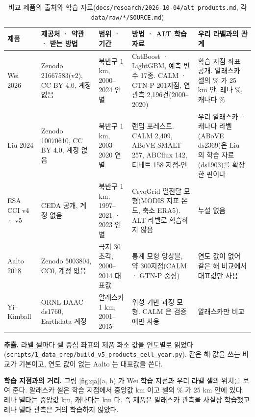 \documentclass[10pt]{article}
\begin{document}
\begin{table}[!htbp]\centering\footnotesize
\caption{비교 제품의 출처와 학습 자료(\texttt{docs/research/2026-10-04/alt\_products.md}, 각 \texttt{data/raw/*/SOURCE.md})}\label{tab:q2}
\begin{tabularx}{\textwidth}{>{\raggedright\arraybackslash}p{}>{\raggedright\arraybackslash}p{}>{\raggedright\arraybackslash}p{}YY}
\toprule
제품 & 제공처 · 약관 · 받는 방법 & 범위 · 기간 & 방법 · ALT 학습 자료 & 우리 라벨과의 관계 \\ \midrule
Wei 2026 & Zenodo 21667583(v2), CC BY 4.0, 계정 없음 & 북반구 1 km, 2000--2024 연별 & CatBoost · LightGBM, 예측 변수 17종. CALM · GTN-P 201지점, 연 관측 2,196건(2000--2020) & 학습 지점 좌표 공개. 알래스카 셀의 \ndistweiAkle{} \% 가 25 km 안, 레나 \ndistweiLele{} \%, 캐나다 \ndistweiCale{} \% \\
Liu 2024 & Zenodo 10070610, CC BY 4.0, 계정 없음 & 북반구 1 km, 2003--2020 연별 & 랜덤 포레스트. CALM 2,409, ABoVE SMALT 257, ABCflux 142, 티베트 158 지점-연 & 우리 알래스카 · 캐나다 라벨(ABoVE ds2369)은 Liu 의 학습 자료(ds1903)를 확장한 판이다 \\
ESA CCI v4 · v5 & CEDA 공개, 계정 없음 & 북반구 1 km, 1997--2021 · 2023 연별 & CryoGrid 열전달 모형(MODIS 지표 온도, 축소 ERA5). ALT 라벨로 학습하지 않음 & 누설 없음 \\
Aalto 2018 & Zenodo 5003804, CC0, 계정 없음 & 극지 30초각, 2000--2014 대표값 & 통계 모형 앙상블, 약 300지점(CALM · GTN-P 중심) & 연도 값이 없어 같은 해 비교에서 대표값만 사용 \\
Yi--Kimball & ORNL DAAC ds1760, Earthdata 계정 & 알래스카 1 km, 2001--2015 & 위성 기반 과정 모형. CALM 은 검증에만 사용 & 알래스카만 비교 \\
\bottomrule
\end{tabularx}
\end{table}

\textbf{추출.} 라벨 셀마다 셀 중심 좌표의 제품 화소 값을 연도별로 읽었다(\texttt{scripts/1\_data\_prep/build\_v5\_products\_cell\_year.py}). 같은 해 값을 쓰는 비교가 기본이고, 연도 값이 없는 Aalto 는 대표값을 쓴다.

\textbf{학습 지점과의 거리.} 그림 \ref{fig:qa}(a, b) 가 Wei 학습 지점과 우리 라벨 셀의 위치를 보여 준다. 알래스카 셀은 학습 지점에서 중앙값 \ndistweiAkmed{} km 이고 셀의 \ndistweiAkle{} \% 가 25 km 안에 있다. 레나 델타는 중앙값 \ndistweiLemed{} km, 캐나다는 \ndistweiCamed{} km 다. 즉 제품은 알래스카 관측을 사실상 학습했고 레나 델타 관측은 거의 학습하지 않았다.
\end{document}
